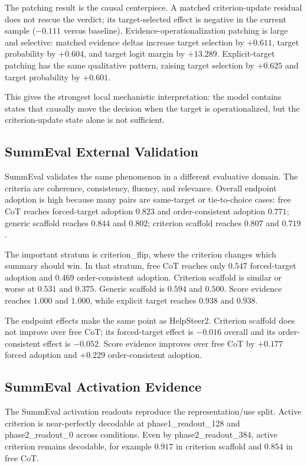 \documentclass[11pt]{article}
\begin{document}
The patching result is the causal centerpiece. A matched criterion-update
residual does not rescue the verdict; its target-selected effect is negative
in the current sample ($-0.111$ versus baseline). Evidence-operationalization
patching is large and selective: matched evidence deltas increase target
selection by $+0.611$, target probability by $+0.604$, and target logit margin
by $+13.289$. Explicit-target patching has the same qualitative pattern,
raising target selection by $+0.625$ and target probability by $+0.601$.

This gives the strongest local mechanistic interpretation: the model contains
states that causally move the decision when the target is operationalized, but
the criterion-update state alone is not sufficient.

\subsection{SummEval External Validation}

SummEval validates the same phenomenon in a different evaluative domain. The
criteria are coherence, consistency, fluency, and relevance. Overall endpoint
adoption is high because many pairs are same-target or tie-to-choice cases:
free CoT reaches forced-target adoption $0.823$ and order-consistent adoption
$0.771$; generic scaffold reaches $0.844$ and $0.802$; criterion scaffold
reaches $0.807$ and $0.719$.

The important stratum is criterion\_flip, where the criterion changes which
summary should win. In that stratum, free CoT reaches only $0.547$
forced-target adoption and $0.469$ order-consistent adoption. Criterion
scaffold is similar or worse at $0.531$ and $0.375$. Generic scaffold is
$0.594$ and $0.500$. Score evidence reaches $1.000$ and $1.000$, while
explicit target reaches $0.938$ and $0.938$.

The endpoint effects make the same point as HelpSteer2. Criterion scaffold
does not improve over free CoT; its forced-target effect is $-0.016$ overall
and its order-consistent effect is $-0.052$. Score evidence improves over free
CoT by $+0.177$ forced adoption and $+0.229$ order-consistent adoption.

\subsection{SummEval Activation Evidence}

The SummEval activation readouts reproduce the representation/use split.
Active criterion is near-perfectly decodable at phase1\_readout\_128 and
phase2\_readout\_0 across conditions. Even by phase2\_readout\_384, active
criterion remains decodable, for example $0.917$ in criterion scaffold and
$0.854$ in free CoT.
\end{document}
